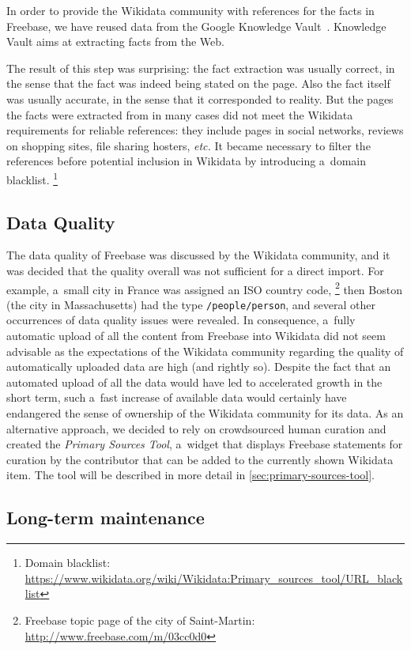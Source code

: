 \documentclass{acm_proc_article-sp}
\begin{document}
In order to provide the Wikidata community with references for the facts in Freebase,
we have reused data from the Google
Knowledge Vault~\cite{dong2014knowledge}. Knowledge Vault aims at extracting facts from the Web.

The result of this step was surprising: 
the fact extraction was usually correct, in the sense that the fact was indeed being stated on the page.
Also the fact itself was usually accurate, in the sense that it corresponded to reality.
But the pages the facts were extracted from in many cases did not meet
the Wikidata requirements for reliable references:
they include pages in social networks, reviews on shopping sites, file sharing hosters, \emph{etc.}
It became necessary to filter the references before potential inclusion in Wikidata
by introducing a~domain blacklist.%
\footnote{Domain blacklist:
\url{https://www.wikidata.org/wiki/Wikidata:Primary_sources_tool/URL_blacklist}}

\subsection{Data Quality}
\label{sec:dataquality}

The data quality of Freebase was discussed by the Wikidata community, and it
was decided that the quality overall was not sufficient for a direct import.
For example, a~small city in France was assigned an ISO country code,%
\footnote{Freebase topic page of the city of Saint-Martin: \url{http://www.freebase.com/m/03cc0d0}}
then Boston (the city in Massachusetts) had the type \texttt{/people/person},
and several other occurrences of data quality issues were revealed.
In consequence, a~fully automatic upload of all the content from Freebase into Wikidata
did not seem advisable as the expectations of the Wikidata community regarding the
quality of automatically uploaded data are high (and rightly so).
Despite the fact that an automated upload of all the data
would have led to accelerated growth in the short term,
such a~fast increase of available data would certainly have endangered
the sense of ownership of the Wikidata community for its data.
As an alternative approach, we decided to rely on crowdsourced human curation
and created the \emph{Primary Sources Tool},
a~widget that displays Freebase statements
for curation by the contributor that can be added to the currently shown Wikidata item.
The tool will be described in more detail in \autoref{sec:primary-sources-tool}.

\subsection{Long-term maintenance}
\label{sec:longtermmaintenance}
\end{document}
